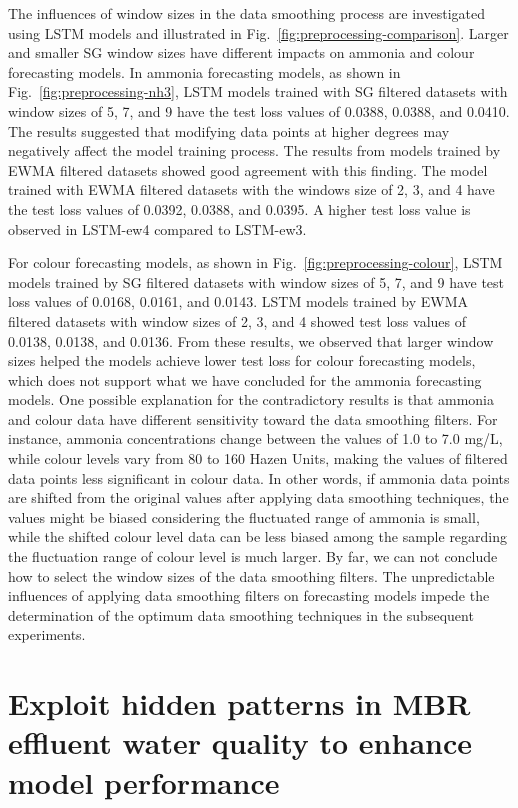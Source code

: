 The influences of window sizes in the data smoothing process are investigated using LSTM models and illustrated in Fig.~\ref{fig:preprocessing-comparison}. Larger and smaller SG window sizes have different impacts on ammonia and colour forecasting models. In ammonia forecasting models, as shown in Fig.~\ref{fig:preprocessing-nh3}, LSTM models trained with SG filtered datasets with window sizes of 5, 7, and 9 have the test loss values of 0.0388, 0.0388, and 0.0410. The results suggested that modifying data points at higher degrees may negatively affect the model training process. The results from models trained by EWMA filtered datasets showed good agreement with this finding. The model trained with EWMA filtered datasets with the windows size of 2, 3, and 4 have the test loss values of 0.0392, 0.0388, and 0.0395. A higher test loss value is observed in LSTM-ew4 compared to LSTM-ew3.

For colour forecasting models, as shown in Fig.~\ref{fig:preprocessing-colour}, LSTM models trained by SG filtered datasets with window sizes of 5, 7, and 9 have test loss values of 0.0168, 0.0161, and 0.0143. LSTM models trained by EWMA filtered datasets with window sizes of 2, 3, and 4 showed test loss values of 0.0138, 0.0138, and 0.0136. From these results, we observed that larger window sizes helped the models achieve lower test loss for colour forecasting models, which does not support what we have concluded for the ammonia forecasting models. One possible explanation for the contradictory results is that ammonia and colour data have different sensitivity toward the data smoothing filters. For instance, ammonia concentrations change between the values of 1.0 to 7.0 mg/L, while colour levels vary from 80 to 160 Hazen Units, making the values of filtered data points less significant in colour data. In other words, if ammonia data points are shifted from the original values after applying data smoothing techniques, the values might be biased considering the fluctuated range of ammonia is small, while the shifted colour level data can be less biased among the sample regarding the fluctuation range of colour level is much larger. By far, we can not conclude how to select the window sizes of the data smoothing filters. The unpredictable influences of applying data smoothing filters on forecasting models impede the determination of the optimum data smoothing techniques in the subsequent experiments. 

\section{Exploit hidden patterns in MBR effluent water quality to enhance model performance}
